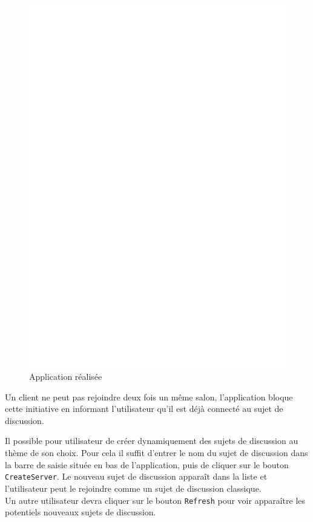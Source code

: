\documentclass[12pt]{article}
\begin{document}
\begin{figure}[htb]
  \includegraphics[scale=.3]{img/dia.eps}
  \caption{Application réalisée}
  \label{fig:dia}
\end{figure}

Un client ne peut pas rejoindre deux fois un même salon, l'application bloque cette initiative en informant l'utilisateur qu'il est déjà connecté au sujet de discussion.

Il possible pour utilisateur de créer dynamiquement des sujets de discussion au thème de son choix. Pour cela il suffit d'entrer le nom du sujet de discussion dans la barre de saisie située en bas de l'application, puis de cliquer sur le bouton \verb+CreateServer+. Le nouveau sujet de discussion apparaît dans la liste et l'utilisateur peut le rejoindre comme un sujet de discussion classique. 
\hfill \\
\hspace{4cm} \danger Un autre utilisateur devra cliquer sur le bouton \verb+Refresh+ pour voir apparaître les potentiels nouveaux sujets de discussion.
\end{document}
